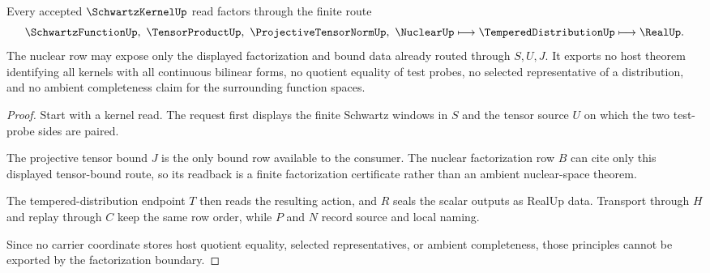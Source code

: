 \begin{theorem}
\label{thm:schwartz-kernel-nuclear-factorization-boundary}
Every accepted $\SchwartzKernelUp$ read factors through the finite route
$$
\SchwartzFunctionUp,\ \TensorProductUp,\ \ProjectiveTensorNormUp,\ \NuclearUp
\longmapsto
\TemperedDistributionUp
\longmapsto
\RealUp .
$$
The nuclear row may expose only the displayed factorization and bound data already routed through $S,U,J$. It exports no host theorem identifying all kernels with all continuous bilinear forms, no quotient equality of test probes, no selected representative of a distribution, and no ambient completeness claim for the surrounding function spaces.
\end{theorem}
\begin{proof}
Start with a kernel read. The request first displays the finite Schwartz windows in $S$ and the tensor source $U$ on which the two test-probe sides are paired.

The projective tensor bound $J$ is the only bound row available to the consumer. The nuclear factorization row $B$ can cite only this displayed tensor-bound route, so its readback is a finite factorization certificate rather than an ambient nuclear-space theorem.

The tempered-distribution endpoint $T$ then reads the resulting action, and $R$ seals the scalar outputs as RealUp data. Transport through $H$ and replay through $C$ keep the same row order, while $P$ and $N$ record source and local naming.

Since no carrier coordinate stores host quotient equality, selected representatives, or ambient completeness, those principles cannot be exported by the factorization boundary.
\end{proof}



